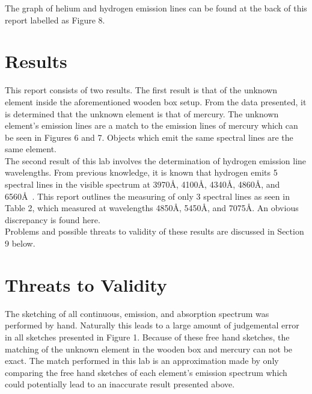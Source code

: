 \documentclass{article}
\begin{document}
The graph of helium and hydrogen emission lines can be found at the back of this
report labelled as Figure 8.


\section{Results}

This report consists of two results. The first result is that of the unknown element
inside the aforementioned wooden box setup. From the data presented, it is determined
that the unknown element is that of mercury. The unknown element's emission lines are
a match to the emission lines of mercury which can be seen in Figures 6 and 7. Objects 
which emit the same spectral lines are the same element.\\

The second result of this lab involves the determination of hydrogen emission line
wavelengths.
From previous knowledge, it is known that hydrogen emits 5 spectral lines in the visible
spectrum at 3970\AA, 4100\AA, 4340\AA, 4860\AA, and 6560\AA~\cite{Balmer:1885}. 
This report outlines the
measuring of only 3 spectral lines as seen in Table 2, which measured at wavelengths
4850\AA, 5450\AA, and 7075\AA. An obvious discrepancy is found here. \\

Problems and possible threats to validity of these results are discussed in Section
9 below.



\section{Threats to Validity}

The sketching of all continuous, emission, and absorption spectrum was performed by hand.
Naturally this leads to a large amount of judgemental error in all sketches 
presented in Figure 1. Because of these free hand sketches, the matching of the unknown
element in the wooden box and mercury can not be exact. The match performed in this 
lab is an approximation made by only comparing the free hand sketches of each 
element's emission spectrum which could potentially lead to an inaccurate result
presented above.\\
\end{document}
